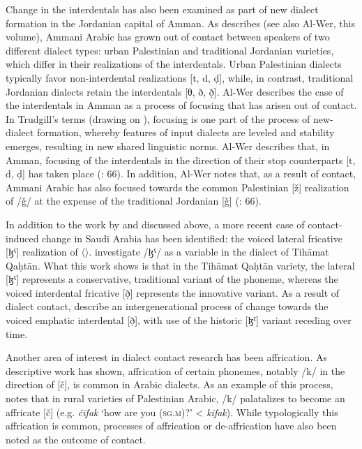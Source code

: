 \documentclass[output=paper]{langsci/langscibook}
\begin{document}
  Change in the interdentals has also been examined as part of new dialect formation in the Jordanian capital of Amman. As \citet{Al-Wer2007} describes (see also Al-Wer, this volume), Ammani Arabic has grown out of contact between speakers of two different dialect types: urban Palestinian and traditional Jordanian varieties, which differ in their realizations of the interdentals. Urban Palestinian dialects typically favor non-interdental realizations [t, d, ḍ], while, in contrast, traditional Jordanian dialects retain the interdentals [θ, ð, ð̣]. Al-Wer describes the case of the interdentals in Amman as a process of focusing \citep{Trudgill2004} that has arisen out of contact. In Trudgill’s terms (drawing on \citealt{LePageTabouret-Keller1985}), focusing is one part of the process of new-dialect formation, whereby features of input dialects are leveled and stability emerges, resulting in new shared linguistic norms. Al-Wer describes that, in Amman, focusing of the interdentals in the direction of their stop counterparts [t, d, ḍ] has taken place (\citealt{Al-Wer2007}: 66). In addition, Al-Wer notes that, as a result of contact, Ammani Arabic has also focused towards the common Palestinian [ž] realization of /ǧ/ at the expense of the traditional Jordanian [ǧ] (\citealt{Al-Wer2007}: 66).  

  In addition to the work by \citet{Al-Essa2008} and \citet{Alghamdi2014} discussed above, a more recent case of contact-induced change in Saudi Arabia has been identified: the voiced lateral fricative [ɮˤ] realization of 〈{}〉. \citet{Al-WerAl-Qahtani2016} investigate /ɮˤ/ as a variable in the dialect of Tihāmat Qaḥtān. What this work shows is that in the Tihāmat Qaḥtān variety, the lateral [ɮˤ] represents a conservative, traditional variant of the phoneme, whereas the voiced interdental fricative [ð̣] represents the innovative variant. As a result of dialect contact, \citet{Al-WerAl-Qahtani2016} describe an intergenerational process of change towards the voiced emphatic interdental [ð̣], with use of the historic [ɮˤ] variant receding over time.

  Another area of interest in dialect contact research has been affrication. As descriptive work has shown, affrication of certain phonemes, notably /k/ in the direction of [č], is common in Arabic dialects. As an example of this process, \citet{Shahin2011} notes that in rural varieties of Palestinian Arabic, /k/ palatalizes to become an affricate [č] (e.g. \textit{čīfak} ‘how are you (\textsc{sg.m})?’ < \textit{kīfak}). While typologically this affrication is common, processes of affrication or de-affrication have also been noted as the outcome of contact. 
\end{document}

